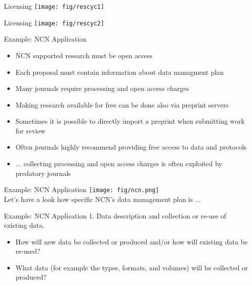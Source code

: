 \documentclass[10pt]{beamer}
\begin{document}
\begin{frame}{Licensing}
  \texttt{[image: fig/rescyc1]}
\end{frame}

\begin{frame}{Licensing}
  \texttt{[image: fig/rescyc2]}
\end{frame}

\begin{frame}{Example: NCN Application}
  \begin{itemize}
    \item NCN supported research must be open access
    \item Each proposal must contain information about data managment plan
    \vspace{0.5cm}
    \item Many journals require processing and open access charges
    \item Making research available for free can be done also via preprint servers
    \item Sometimes it is possible to directly import a preprint when submitting work for review
    \item Often journals highly recommend providing free access to data and protocols
    \vspace{0.5cm}
    \item ... collecting processing and open access charges is often exploited by predatory journals 
  \end{itemize}
\end{frame}

\begin{frame}{Example: NCN Application}
  \texttt{[image: fig/ncn.png]}
  \\
  Let's have a look how specific NCN's data management plan is ...
\end{frame}

\begin{frame}{Example: NCN Application}
\textcolor{subtitle}{1. Data description and collection or re-use of existing data.}
  \begin{itemize}
    \item How will new data be collected or produced and/or how will existing data be re-used?
    \\
    {\color{gray}{How do you generate data? Do you use data generated by other research?}}
    \item What data (for example the types, formats, and volumes) will be collected or produced?
    \\
    {\color{gray}{Discipline specific; may be even plain text files or Excel sheets.}}
  \end{itemize}
\end{frame}
\end{document}
